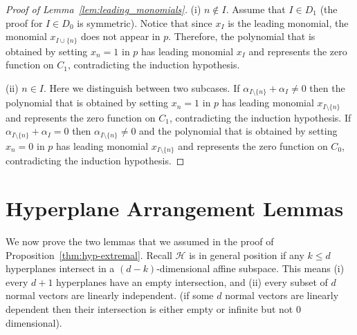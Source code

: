\documentclass[11pt]{article}
\theoremstyle{definition}
\newcommand{\1}{\mathbf{1}}
\renewcommand{\leq}{\leqslant}
\begin{document}
\begin{appendix}
\begin{proof}[Proof of Lemma~\ref{lem:leading_monomials}]
(i) $n\notin I$. Assume that $I\in D_1$ (the proof for $I \in D_0$ is symmetric). Notice that since $x_I$ is the leading monomial, the monomial $x_{I\cup\{n\}}$ does not appear in $p$. Therefore, the polynomial that is obtained by setting $x_n=1$ in $p$ has leading monomial $x_I$ and represents the zero function on $C_1$, contradicting the induction hypothesis.

(ii) $n\in I$. Here we distinguish between two subcases. If $\alpha_{I\setminus\{n\}}+\alpha_I\neq 0$ then the polynomial that is obtained by setting $x_n=1$ in $p$ has leading monomial $x_{I\setminus\{n\}}$ and represents the zero function on $C_1$, contradicting the induction hypothesis.
If $\alpha_{I\setminus\{n\}}+\alpha_I = 0$ then $\alpha_{I\setminus\{n\}}\neq 0$ and the polynomial that is obtained by setting $x_n=0$ in $p$ has leading monomial $x_{I\setminus\{n\}}$ and represents the zero function on $C_0$, contradicting the induction hypothesis.
\end{proof} 


\section{Hyperplane Arrangement Lemmas}\label{app:hyplerplanes}
We now prove the two lemmas that we assumed in the proof of Proposition~\ref{thm:hyp-extremal}.  Recall $\mathcal{H}$ is in general position if any $k\leq d$ hyperplanes intersect in a $(d-k)$-dimensional affine subspace. This means (i) every $d+1$ hyperplanes have an empty intersection, and (ii) every subset of $d$ normal vectors are linearly independent. (if some $d$ normal vectors are linearly dependent then their intersection  is either empty or infinite but not $0$ dimensional).


\end{appendix}
\end{document}

